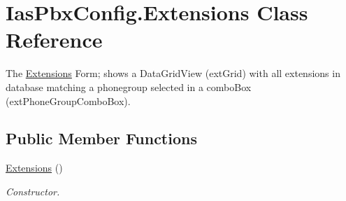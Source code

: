 \hypertarget{class_ias_pbx_config_1_1_extensions}{
\section{IasPbxConfig.Extensions Class Reference}
\label{class_ias_pbx_config_1_1_extensions}
}


The \hyperlink{class_ias_pbx_config_1_1_extensions}{Extensions} Form; shows a DataGridView (extGrid) with all extensions in database matching a phonegroup selected in a comboBox (extPhoneGroupComboBox).  
\subsection*{Public Member Functions}
\begin{DoxyCompactItemize}
\item 
\hyperlink{class_ias_pbx_config_1_1_extensions_a424a45774e493b24d6162f1602b5d618}{Extensions} ()
\begin{DoxyCompactList}\small\item\em Constructor. \item\end{DoxyCompactList}\end{DoxyCompactItemize}
